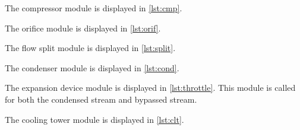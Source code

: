 The compressor module is displayed in \cref{lst:cmp}.


The orifice module is displayed in \cref{lst:orif}.


The flow split module is displayed in \cref{lst:split}.


The condenser module is displayed in \cref{lst:cond}.


The expansion device module is displayed in \cref{lst:throttle}.
This module is called for both the condensed stream and bypassed stream.


The cooling tower module is displayed in \cref{lst:clt}.
